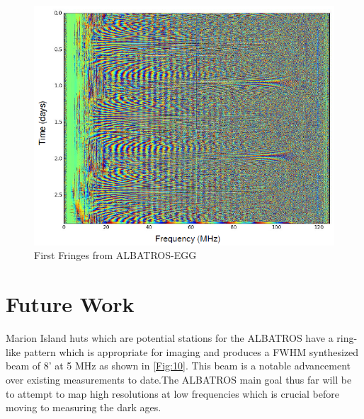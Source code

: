 \documentclass{ws-jai}
\begin{document}
\begin{figure}[ht!]
	\begin{center}
		\includegraphics[width=0.7\linewidth]{Figures/First-fringes-of-ALBATROS-EGG.PNG}
		\caption{First Fringes from ALBATROS-EGG}
		\label{Fig:fringes}
	\end{center}
\end{figure}


		
\section{Future Work}

Marion Island huts which are potential stations for the ALBATROS have a ring-like pattern which is appropriate for imaging and produces a FWHM synthesized beam of 8' at 5 MHz as shown in \autoref{Fig:10}. This beam is a notable advancement over existing measurements to date.The ALBATROS main goal thus far will be to attempt to map high resolutions at low frequencies which is crucial before moving to measuring the dark ages.
\end{document}
